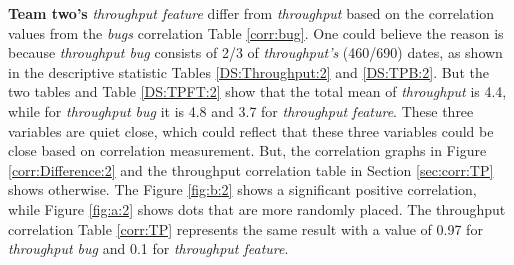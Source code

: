 \documentclass[UKenglish]{ifimaster}  %
\begin{document}
\textbf{Team two's} \textit{throughput feature} differ from \textit{throughput} based on the correlation values from the \textit{bugs} correlation Table \ref{corr:bug}. One could believe the reason is because \textit{throughput bug} consists of 2/3 of \textit{throughput's} (460/690) dates, as shown in the descriptive statistic Tables \ref{DS:Throughput:2} and \ref{DS:TPB:2}. But the two tables and Table \ref{DS:TPFT:2} show that the total mean of \textit{throughput} is 4.4, while for \textit{throughput bug} it is 4.8 and 3.7 for \textit{throughput feature}. These three variables are quiet close, which could reflect that these three variables could be close based on correlation measurement. 
But, the correlation graphs in Figure \ref{corr:Difference:2} and the throughput correlation table in Section \ref{sec:corr:TP} shows otherwise. The Figure \ref{fig:b:2} shows a significant positive correlation, while Figure \ref{fig:a:2} shows dots that are more randomly placed. The throughput correlation Table \ref{corr:TP} represents the same result with a value of 0.97 for \textit{throughput bug} and  0.1 for \textit{throughput feature}.
\end{document}
